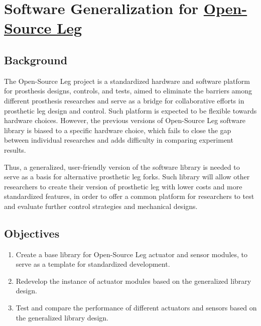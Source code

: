 \documentclass[12pt]{article}
\begin{document}


\newpage

\section{Software Generalization for \href{https://www.opensourceleg.org/}{Open-Source Leg}}


\subsection{Background}



The Open-Source Leg project is a standardized hardware and software platform for prosthesis designs, controls, and tests, aimed to eliminate the barriers among different prosthesis researches and serve as a bridge for collaborative efforts in prosthetic leg design and control. Such platform is expected to be flexible towards hardware choices. However, the previous versions of Open-Source Leg software library is biased to a specific hardware choice, which fails to close the gap between individual researches and adds difficulty in comparing experiment results. 

Thus, a generalized, user-friendly version of the software library is needed to serve as a basis for alternative prosthetic leg forks. Such library will allow other researchers to create their version of prosthetic leg with lower costs and more standardized features, in order to offer a common platform for researchers to test and evaluate further control strategies and mechanical designs.


\subsection{Objectives}

\begin{enumerate}
    \item {Create a base library for Open-Source Leg actuator and sensor modules, to serve as a template for standardized development.}
    \item {Redevelop the instance of actuator modules based on the generalized library design.}
    \item {Test and compare the performance of different actuators and sensors based on the generalized library design.}
\end{enumerate}
\end{document}
